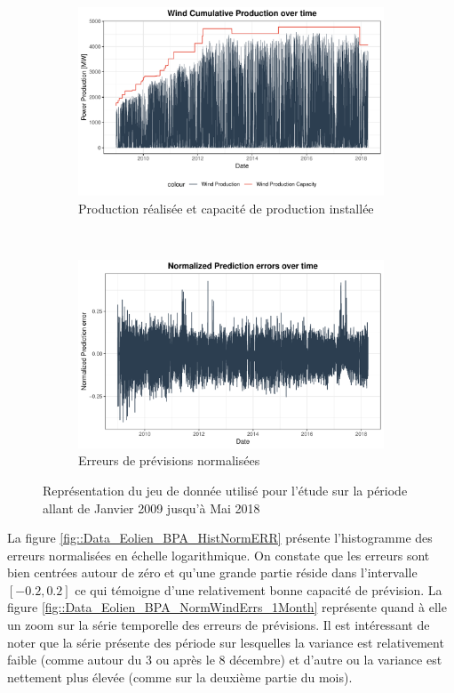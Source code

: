 \documentclass[12pt]{report}
\begin{document}
\begin{figure}[ht!]
\begin{center}
\begin{subfigure}[b]{0.45\textwidth}
	\includegraphics[width=\textwidth]{Images/Data/Eolien/BPA/Normalize.pdf}
	\caption{Production réalisée et capacité de production installée}
	\label{fig::PredErrors_all}
\end{subfigure}
~
\begin{subfigure}[b]{0.45\textwidth}
	\includegraphics[width=\textwidth]{Images/Data/Eolien/BPA/NormWindErrs_All.pdf}
	\caption{Erreurs de prévisions normalisées }
	\label{fig:Data_BPA_WholeNorm}
\end{subfigure}
\caption{Représentation du jeu de donnée utilisé pour l'étude sur la période  allant de Janvier 2009 jusqu'à Mai 2018 }
\label{fig::DataPres}	
\end{center}
\end{figure}

La figure \ref{fig::Data_Eolien_BPA_HistNormERR} présente l'histogramme des erreurs normalisées en échelle logarithmique. On constate que les erreurs sont bien centrées autour de zéro et qu'une grande partie réside dans l'intervalle $[-0.2,0.2]$  ce qui témoigne d'une relativement bonne capacité de prévision.
La figure \ref{fig::Data_Eolien_BPA_NormWindErrs_1Month} représente quand à elle un zoom sur la série temporelle des erreurs de prévisions. Il est intéressant de noter que la série présente des période sur lesquelles la variance est relativement faible (comme autour du 3 ou après le 8 décembre) et d'autre ou la variance est nettement plus élevée (comme sur la deuxième partie du mois).
\end{document}
